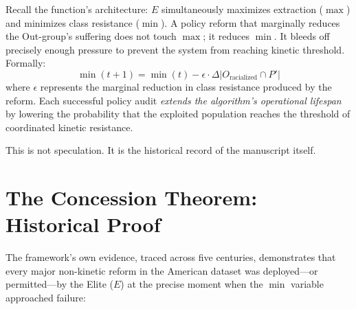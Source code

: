 \documentclass[12pt,openany]{book}
\begin{document}
Recall the function's architecture: $E$ simultaneously maximizes extraction ($\max$) and minimizes class resistance ($\min$). A policy reform that marginally reduces the Out-group's suffering does not touch $\max$; it reduces $\min$. It bleeds off precisely enough pressure to prevent the system from reaching kinetic threshold. Formally:
\[
\min(t+1) = \min(t) - \epsilon \cdot \Delta|O_{\text{racialized}} \cap P'|
\]
where $\epsilon$ represents the marginal reduction in class resistance produced by the reform. Each successful policy audit \textit{extends the algorithm's operational lifespan} by lowering the probability that the exploited population reaches the threshold of coordinated kinetic resistance.

This is not speculation. It is the historical record of the manuscript itself.

\section{The Concession Theorem: Historical Proof}

The framework's own evidence, traced across five centuries, demonstrates that every major non-kinetic reform in the American dataset was deployed---or permitted---by the Elite ($E$) at the precise moment when the $\min$ variable approached failure:
\end{document}
